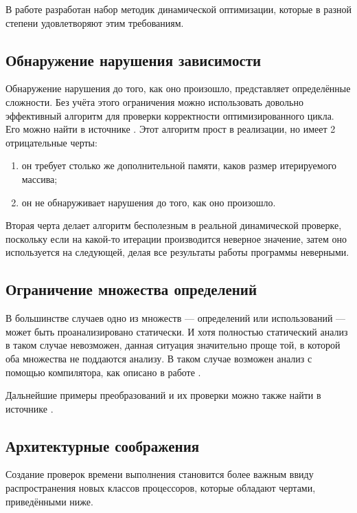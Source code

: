 В работе \cite{ZuckPFGH02} разработан набор методик динамической оптимизации, которые в разной степени удовлетворяют этим требованиям.

\subsection{Обнаружение нарушения зависимости}

Обнаружение нарушения до того, как оно произошло, представляет определённые сложности. Без учёта этого ограничения можно использовать довольно эффективный алгоритм для проверки корректности оптимизированного цикла. Его можно найти в источнике \cite{ZuckPFGH02}. Этот алгоритм прост в реализации, но имеет 2 отрицательные черты:

\begin{enumerate}
	\item он требует столько же дополнительной памяти, каков размер итерируемого массива;
	\item он не обнаруживает нарушения до того, как оно произошло.
\end{enumerate}

Вторая черта делает алгоритм бесполезным в реальной динамической проверке, поскольку если на какой-то итерации производится неверное значение, затем оно используется на следующей, делая все результаты работы программы неверными.

\subsection{Ограничение множества определений}

В большинстве случаев одно из множеств --- определений или использований --- может быть проанализировано статически. И хотя полностью статический анализ в таком случае невозможен, данная ситуация значительно проще той, в которой оба множества не поддаются анализу. В таком случае возможен анализ с помощью компилятора, как описано в работе \cite{ZuckPFGH02}.

Дальнейшие примеры преобразований и их проверки можно также найти в источнике \cite{ZuckPFGH02}.

\subsection{Архитектурные соображения}

Создание проверок времени выполнения становится более важным ввиду распространения новых классов процессоров, которые обладают чертами, приведёнными ниже.


